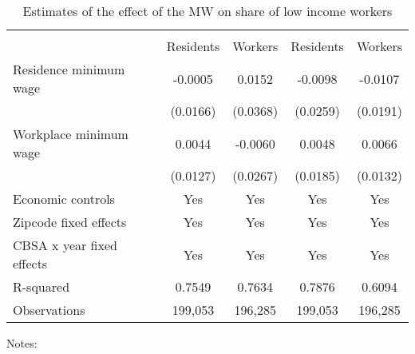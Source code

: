 \begin{table}[hbt!] \centering
    \caption{Estimates of the effect of the MW on share of low income workers}
    \label{tab:share_migration}
    \begin{tabular}{lcccc}
        \toprule 
        &  &  \\ \cmidrule(lr){2-3} \cmidrule(lr){4-5}
                    & Residents & Workers & Residents & Workers \\  \midrule
        Residence minimum wage &  -0.0005  &  0.0152  &  -0.0098  &  -0.0107  \\
                               & (0.0166) & (0.0368) & (0.0259) & (0.0191) \\
        Workplace minimum wage &  0.0044  &  -0.0060  &  0.0048  &  0.0066  \\
                               & (0.0127) & (0.0267) & (0.0185) & (0.0132) \\  \midrule
        Economic controls           &  Yes   &  Yes   &  Yes  &  Yes  \\
        Zipcode fixed effects       &  Yes   &  Yes   &  Yes  &  Yes  \\
        CBSA x year fixed effects   &  Yes   &  Yes   &  Yes  &  Yes  \\
        R-squared                   &  0.7549   &  0.7634   &  0.7876  &  0.6094  \\
        Observations                &  199,053  &  196,285  &  199,053 &  196,285  
        \\\bottomrule
    \end{tabular}

    
    \begin{minipage}{.95\textwidth} \footnotesize
        \vspace{2mm}
        Notes:
    \end{minipage}
\end{table}
